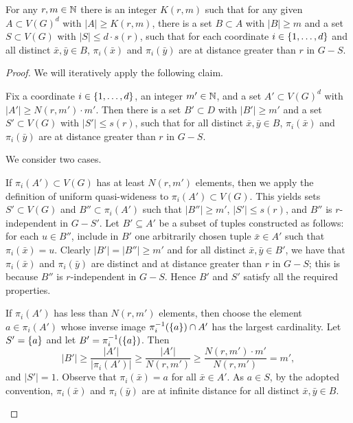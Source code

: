 \begin{lemma}\label{lem:step1} For any $r,m\in \mathbb{N}$ there is an integer $K(r,m)$ such that
	for any given $A\subset V(G)^d$ with $|A|\ge K(r,m)$,
	there is a set $B\subset A$ with $|B|\ge m$ and a set $S\subset V(G)$ with $|S|\le d\cdot s(r)$, 
	such that for each coordinate $i\in\{1,\ldots,d\}$ and all distinct $\bar x,\bar y\in B$,
 $\pi_i(\bar x)$ and $\pi_i(\bar y)$ are at distance greater than $r$ in $G-S$. 
\end{lemma}
\begin{proof}
We will iteratively apply the following claim.


\begin{claim}\label{claim:ith-coord}
Fix a coordinate $i\in\{1,\ldots,d\}$, an integer $m'\in\mathbb{N}$, and a  set $A'\subset V(G)^d$ with  $|A'|\ge N(r,m')\cdot m'$.
Then there is a set $B'\subset D$ with $|B'|\ge m'$
and a set $S'\subset V(G)$ with $|S'|\le  s(r)$, such that for all distinct $\bar x,\bar y\in B$,
 $\pi_i(\bar x)$ and $\pi_i(\bar y)$ are at distance greater than $r$ in $G-S$. 
\end{claim}
\begin{clproof}
We consider two cases.

If $\pi_i(A')\subset V(G)$ has at least $N(r,m')$ elements, then we apply the definition of uniform quasi-wideness to $\pi_i(A')\subset V(G)$. This yields sets $S'\subset V(G)$ and $B''\subset \pi_i(A')$
such that $|B''|\ge m'$, $|S'|\le s(r)$, and $B''$ is $r$-independent in $G-S'$. 
Let $B'\subseteq A'$ be a subset of tuples constructed as follows: for each $u\in B''$, include in $B'$ one arbitrarily chosen tuple $\bar x\in A'$ such that $\pi_i(\bar x)=u$.
Clearly $|B'|=|B''|\ge m'$ and for all distinct $\bar x,\bar y\in B'$, we have that $\pi_i(\bar x)$ and $\pi_i(\bar y)$ are distinct and at distance greater than $r$ in $G-S$; this is because $B''$ is $r$-independent
in $G-S$. Hence $B'$ and $S'$ satisfy all the required properties.

If $\pi_i(A')$ has less than $N(r,m')$ elements, then choose the element $a\in\pi_i(A')$ whose inverse image $\pi_i^{-1}(\{a\})\cap A'$ has the largest cardinality. Let $S'=\{a\}$ 
and let $B'=\pi_i^{-1}(\{a\})$. Then $$|B'|\ge \frac{|A'|}{|\pi_i(A')|}\ge \frac{|A'|}{N(r,m')}\ge \frac {N(r,m')\cdot m'}{N(r,m')}=m',$$
and $|S'|=1$. Observe that $\pi_i(\bar x)=a$ for all $\bar x\in A'$. As $a\in S$, by the adopted convention, $\pi_i(\bar x)$ and $\pi_i(\bar y)$ are at infinite distance for all distinct $\bar x,\bar y\in B$.
\end{clproof}


\end{proof}
